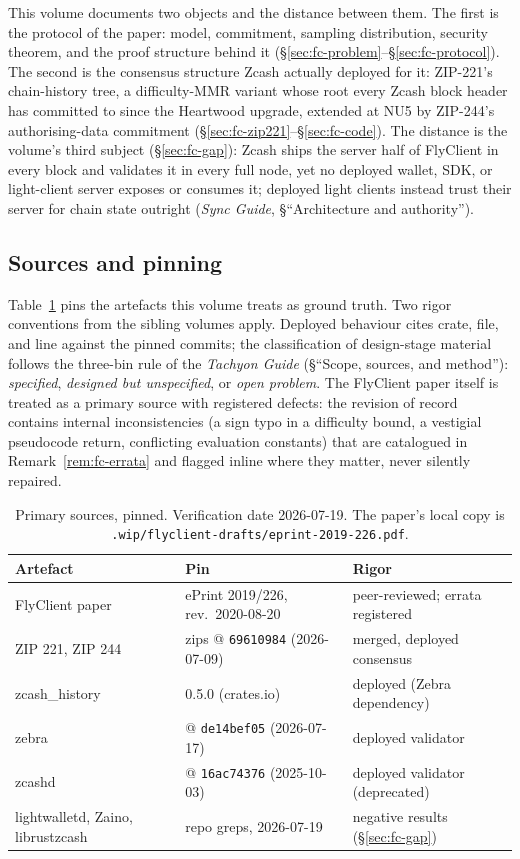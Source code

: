 \documentclass[11pt,a4paper]{article}
\theoremstyle{definition}
\begin{document}
This volume documents two objects and the distance between them. The first is
the protocol of the paper: model, commitment, sampling distribution, security
theorem, and the proof structure behind it
(\S\ref{sec:fc-problem}--\S\ref{sec:fc-protocol}). The second is the
consensus structure Zcash actually deployed for it: ZIP-221's chain-history
tree, a difficulty-MMR variant whose root every Zcash block header has
committed to since the Heartwood upgrade, extended at NU5 by ZIP-244's
authorising-data commitment (\S\ref{sec:fc-zip221}--\S\ref{sec:fc-code}).
The distance is the volume's third subject
(\S\ref{sec:fc-gap}): Zcash ships the server half of FlyClient in every
block and validates it in every full node, yet no deployed wallet, SDK, or
light-client server exposes or consumes it; deployed light clients instead
trust their server for chain state outright (\emph{Sync Guide},
\S``Architecture and authority'').

\subsection{Sources and pinning}\label{sec:fc-sources}

Table~\ref{tab:fc-sources} pins the artefacts this volume treats as ground
truth. Two rigor conventions from the sibling volumes apply. Deployed
behaviour cites crate, file, and line against the pinned commits; the
classification of design-stage material follows the three-bin rule of the
\emph{Tachyon Guide} (\S``Scope, sources, and method''): \emph{specified},
\emph{designed but unspecified}, or \emph{open problem}. The FlyClient paper
itself is treated as a primary source with registered defects: the revision
of record contains internal inconsistencies (a sign typo in a difficulty
bound, a vestigial pseudocode return, conflicting evaluation constants) that
are catalogued in Remark~\ref{rem:fc-errata} and flagged inline where they
matter, never silently repaired.

\begin{table}[htbp]
\centering
\footnotesize
\begin{tabular}{@{}lll@{}}
\toprule
Artefact & Pin & Rigor \\
\midrule
FlyClient paper & ePrint 2019/226, rev.\ 2020-08-20 & peer-reviewed;
errata registered \\
ZIP 221, ZIP 244 & \textsf{zips} @ \texttt{69610984} (2026-07-09) & merged,
deployed consensus \\
\textsf{zcash\_history} & 0.5.0 (crates.io) & deployed (Zebra dependency) \\
\textsf{zebra} & @ \texttt{de14bef05} (2026-07-17) & deployed validator \\
\textsf{zcashd} & @ \texttt{16ac74376} (2025-10-03) & deployed validator
(deprecated) \\
\textsf{lightwalletd}, \textsf{Zaino}, \textsf{librustzcash} &
repo greps, 2026-07-19 & negative results (\S\ref{sec:fc-gap}) \\
\bottomrule
\end{tabular}
\caption{Primary sources, pinned. Verification date 2026-07-19. The paper's
local copy is \texttt{.wip/flyclient-drafts/eprint-2019-226.pdf}.}
\label{tab:fc-sources}
\end{table}
\end{document}
